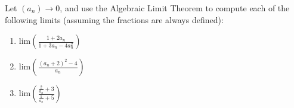 \documentclass[12pt]{article}
\newcommand{\Lim}[1]{\mathrm{lim}\left( #1\right)}
\newenvironment{problem}[2][Problem]{\begin{trivlist} \item[\hskip \labelsep {\bfseries #1}\hskip \labelsep {\bfseries #2.}]}{\end{trivlist}}
\begin{document}
    \begin{problem}{2.3.4} 
      Let $(a_{n})\to 0$, and use the Algebraic Limit Theorem to compute each of the following limits (assuming the fractions are always defined):
    \begin{enumerate}
      \item $\Lim{\frac{1+2a_{n}}{1+3a_{n}-4a_{n}^{2}}}$
      \item $\Lim{\frac{(a_{n}+2)^{2}-4}{a_{n}}}$
      \item $\Lim{\frac{\frac{2}{a_{n}}+3}{\frac{1}{a_{n}}+5}}$
    \end{enumerate}
    \end{problem}
\end{document}
